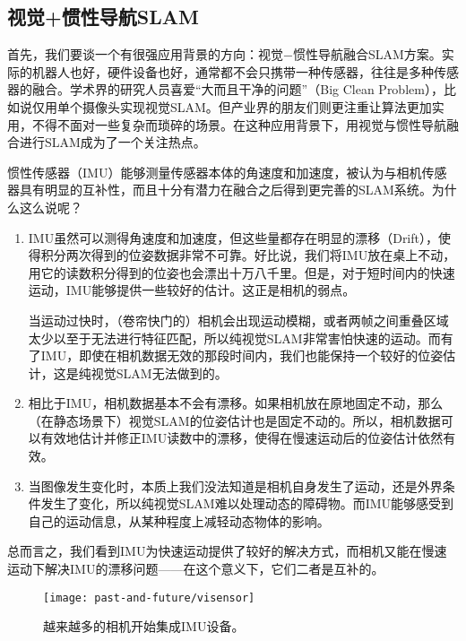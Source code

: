 \subsection{视觉+惯性导航SLAM}

首先，我们要谈一个有很强应用背景的方向：视觉−惯性导航融合SLAM方案。实际的机器人也好，硬件设备也好，通常都不会只携带一种传感器，往往是多种传感器的融合。学术界的研究人员喜爱“大而且干净的问题”（Big Clean Problem），比如说仅用单个摄像头实现视觉SLAM。但产业界的朋友们则更注重让算法更加实用，不得不面对一些复杂而琐碎的场景。在这种应用背景下，用视觉与惯性导航融合进行SLAM成为了一个关注热点。

惯性传感器（IMU）能够测量传感器本体的角速度和加速度，被认为与相机传感器具有明显的互补性，而且十分有潜力在融合之后得到更完善的SLAM系统\textsuperscript{\cite{Gui2015}}。为什么这么说呢？

\begin{enumerate}
	\item IMU虽然可以测得角速度和加速度，但这些量都存在明显的漂移（Drift），使得积分两次得到的位姿数据非常不可靠。好比说，我们将IMU放在桌上不动，用它的读数积分得到的位姿也会漂出十万八千里。但是，对于短时间内的快速运动，IMU能够提供一些较好的估计。这正是相机的弱点。
	
	\clearpage
	\hspace{2em}当运动过快时，（卷帘快门的）相机会出现运动模糊，或者两帧之间重叠区域太少以至于无法进行特征匹配，所以纯视觉SLAM非常害怕快速的运动。而有了IMU，即使在相机数据无效的那段时间内，我们也能保持一个较好的位姿估计，这是纯视觉SLAM无法做到的。
	
	\item 相比于IMU，相机数据基本不会有漂移。如果相机放在原地固定不动，那么（在静态场景下）视觉SLAM的位姿估计也是固定不动的。所以，相机数据可以有效地估计并修正IMU读数中的漂移，使得在慢速运动后的位姿估计依然有效。
	
	\item 当图像发生变化时，本质上我们没法知道是相机自身发生了运动，还是外界条件发生了变化，所以纯视觉SLAM难以处理动态的障碍物。而IMU能够感受到自己的运动信息，从某种程度上减轻动态物体的影响。
\end{enumerate}

总而言之，我们看到IMU为快速运动提供了较好的解决方式，而相机又能在慢速运动下解决IMU的漂移问题——在这个意义下，它们二者是互补的。

\begin{figure}[!thp]
	\centering
	\texttt{[image: past-and-future/visensor]}
	\caption{越来越多的相机开始集成IMU设备。}
	\label{fig:visensor}
\end{figure}

